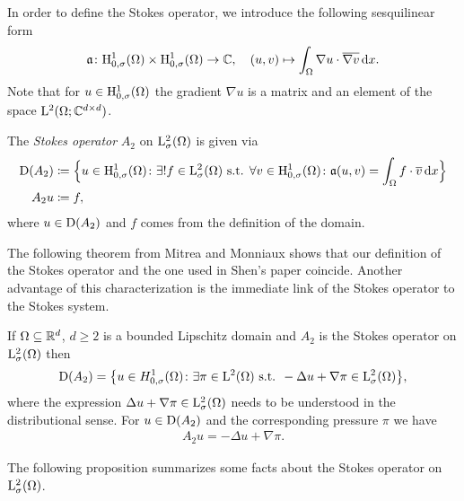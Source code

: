 In order to define the Stokes operator, we introduce the following sesquilinear form
\begin{align*}
  \mathfrak{a} \colon \mathrm{H}_{0,\sigma}^1(\Omega) \times \mathrm{H}_{0,\sigma}^1(\Omega) \to \mathbb{C}, \quad (u,v) \mapsto \int_\Omega \nabla u \cdot \overline{\nabla v} \, {\operatorname{d}\!{x}}.
\end{align*}
Note that for $u \in \mathrm{H}_{0,\sigma}^1(\Omega)$ the gradient $\nabla u$ is a matrix and an element of the space $\mathrm{L}^2(\Omega; \mathbb{C}^{d \times d})$.

\begin{defn}
  \label{defn:stokes}
  The \emph{Stokes operator} $A_2$ on $\mathrm{L}_\sigma^2(\Omega)$ is given via
  \begin{align*}
    \mathrm{D}(A_2) &\coloneqq \Big\{ u \in \mathrm{H}_{0,\sigma}^1(\Omega) \colon \exists ! f \in \mathrm{L}^2_\sigma(\Omega) \text{ s.t. } \forall v \in \mathrm{H}_{0,\sigma}^1(\Omega) \colon \mathfrak{a}(u,v) = \int_\Omega f \cdot \overline v \, {\operatorname{d}\!{x}} \Big\} \\
    A_2 u &\coloneqq f,
  \end{align*}
  where $u \in \mathrm{D}(A_2)$ and $f$ comes from the definition of the domain.
\end{defn}

The following theorem from Mitrea and Monniaux \cite[Thm 4.7]{mitreaMonniaux} shows that our definition of the Stokes operator and the one used in Shen's paper coincide. 
Another advantage of this characterization is the immediate link of the Stokes operator to the Stokes system.

\begin{thm}
  If $\Omega \subseteq \mathbb{R}^d$, $d \geq 2$ is a bounded Lipschitz domain and $A_2$ is the Stokes operator on $\mathrm{L}^2_\sigma(\Omega)$ then
  \begin{align*}
    \mathrm{D}(A_2) = \big\{ u \in H^1_{0,\sigma}(\Omega) \colon \exists \pi \in \mathrm{L}^2(\Omega) \text{ s.t. } -\Delta u + \nabla \pi \in \mathrm{L}^2_\sigma(\Omega) \big\},
  \end{align*}
  where the expression $\Delta u + \nabla \pi \in\mathrm{L}^2_\sigma(\Omega)$ needs to be understood in the distributional sense.
  For $u \in \mathrm{D}(A_2)$ and the corresponding pressure $\pi$ we have
  \begin{align*}
    A_2 u = -\Delta u + \nabla \pi.
  \end{align*}
\end{thm}

The following proposition summarizes some facts about the Stokes operator on $\mathrm{L}^2_\sigma(\Omega)$.

